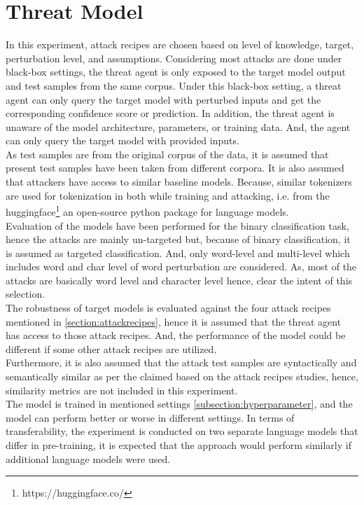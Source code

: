 \documentclass[%
	BCOR=8mm, %
	DIV=12,
	toc=bibliography, %
	toc=listof, %
	oneside, %
	egregdoesnotlikesansseriftitles, %
	]{scrbook}
\begin{document}
\section{Threat Model}
\label{section:threadmodel}
In this experiment, attack recipes are chosen based on level of knowledge, target, perturbation level, and assumptions. Considering most attacks are done under black-box settings, the threat agent is only exposed to the target model output and test samples from the same corpus. Under this black-box setting, a threat agent can only query the target model with perturbed inputs and get the corresponding confidence score or prediction. In addition, the threat agent is unaware of the model architecture, parameters, or training data. And, the agent can only query the target model with provided inputs. \\
As test samples are from the original corpus of the data, it is assumed that present test samples have been taken from different corpora. It is also assumed that attackers have access to similar baseline models. Because, similar tokenizers are used for tokenization in both while training and attacking, i.e. from the huggingface\footnote{https://huggingface.co/} an open-source python package for language models.\\
Evaluation of the models have been performed for the binary classification task, hence the attacks are mainly un-targeted but, because of binary classification, it is assumed as targeted classification. And, only word-level and multi-level which includes word and char level of word perturbation are considered. As, most of the attacks are basically word level and character level hence, clear the intent of this selection.\\
The robustness of target models is evaluated against the four attack recipes mentioned in \ref{section:attackrecipes}, hence it is assumed that the threat agent has access to those attack recipes. And, the performance of the model could be different if some other attack recipes are utilized.\\
 Furthermore, it is also assumed that the attack test samples are syntactically and semantically similar as per the claimed based on the attack recipes studies, hence, similarity metrics are not included in this experiment.\\
 The model is trained in mentioned settings  \ref{subsection:hyperparameter}, and the model can perform better or worse in different settings. In terms of transferability, the experiment is conducted on two separate language models that differ in pre-training, it is expected that the approach would perform similarly if additional language models were used. 
\end{document}
